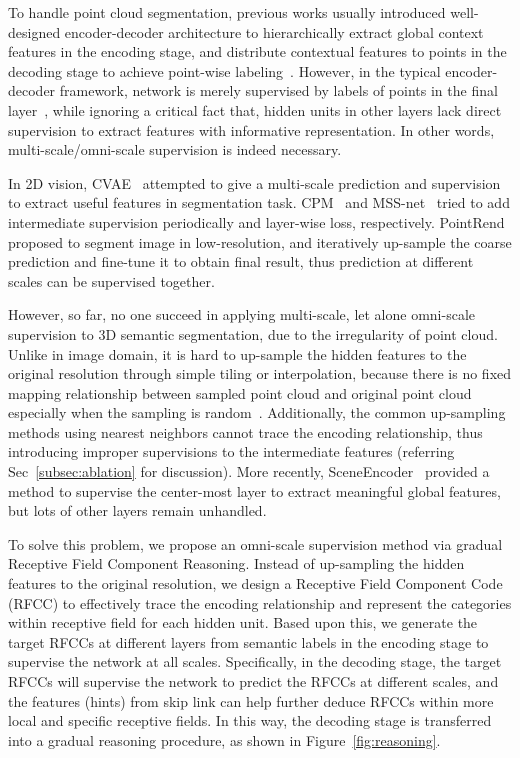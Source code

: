 \documentclass[final]{cvpr}
\begin{document}
To handle point cloud segmentation, previous works usually introduced well-designed encoder-decoder architecture to hierarchically extract global context features in the encoding stage, and distribute contextual features to points in the decoding stage to achieve point-wise labeling~\cite{graham20183d, thomas2019kpconv, yan2020pointasnl}. However, in the typical encoder-decoder framework, network is merely supervised by labels of points in the final layer~\cite{wu2019pointconv, thomas2019kpconv, hu2020randla}, while ignoring a critical fact that, hidden units in other layers lack direct supervision to extract features with informative representation. In other words, multi-scale/omni-scale supervision is indeed necessary.

In 2D vision, CVAE~\cite{sohn2015learning} attempted to give a multi-scale prediction and supervision to extract useful features in segmentation task. CPM~\cite{wei2016convolutional} and MSS-net~\cite{ke2018multi} tried to add intermediate supervision periodically and layer-wise loss, respectively. PointRend~\cite{kirillov2020pointrend} proposed to segment image in low-resolution, and iteratively up-sample the coarse prediction and fine-tune it to obtain final result, thus prediction at different scales can be supervised together.

However, so far, no one succeed in applying multi-scale, let alone omni-scale supervision to 3D semantic segmentation, due to the irregularity of point cloud. Unlike in image domain, it is hard to up-sample the hidden features to the original resolution through simple tiling or interpolation, because there is no fixed mapping relationship between sampled point cloud and original point cloud especially when the sampling is random~\cite{wu2019pointconv,hu2020randla}. 
Additionally, the common up-sampling methods using nearest neighbors cannot trace the encoding relationship, thus introducing improper supervisions to the intermediate features (referring Sec~\ref{subsec:ablation} for discussion).
More recently, SceneEncoder~\cite{xu2020sceneencoder} provided a method to supervise the center-most layer to extract meaningful global features, but lots of other layers remain unhandled.



To solve this problem, we propose an omni-scale supervision method via gradual Receptive Field Component Reasoning. Instead of up-sampling the hidden features to the original resolution, we design a Receptive Field Component Code (RFCC) to effectively trace the encoding relationship and represent the categories within receptive field for each hidden unit. Based upon this, we generate the target RFCCs at different layers from semantic labels in the encoding stage to supervise the network at all scales. Specifically, in the decoding stage, the target RFCCs will supervise the network to predict the RFCCs at different scales, and the features (hints) from skip link can help further deduce RFCCs within more local and specific receptive fields. In this way, the decoding stage is transferred into a gradual reasoning procedure, as shown in Figure~\ref{fig:reasoning}.
\end{document}
